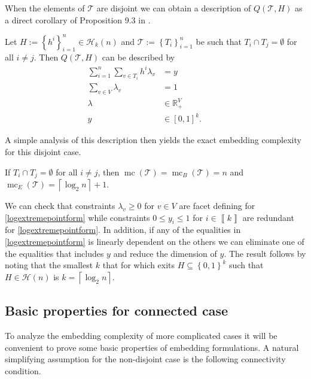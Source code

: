 \documentclass[mnsc]{informs3}
\newcommand{\set}[1]{\left\{#1\right\}}                     %
\newcommand{\bra}[1]{\left(#1\right)}
\newcommand{\sidx}[1]{\left\llbracket     #1 \right\rrbracket}
\newcommand{\Real}{\mathbb R}
\DeclareMathOperator{\mmc}{mc}
\begin{document}
When the elements of $\mathcal{T}$ are disjoint we can obtain a description of $Q\bra{\mathcal{T},H}$ as a direct corollary of Proposition 9.3 in \cite{Mixed-Integer-Linear-Programming-Formulation-Techniques}.
\begin{proposition}Let $H:=\set{h^i}_{i=1}^n\in \mathcal{H}_k(n)$ and $\mathcal{T}:=\set{T_i}_{i=1}^n$ be such that $T_i\cap T_j=\emptyset $ for all $i\neq j$. Then $Q\bra{\mathcal{T},H}$ can be described by 
	\begin{subequations}\label{logextremepointform}
		\begin{alignat}{3}
		\sum\nolimits_{i=1}^n\sum\nolimits_{v\in T_i}  h^i\lambda_{v}&=y&\\
			\sum\nolimits_{v\in V}  \lambda_{v}&=1\\
			\lambda&\in  \Real_+^V&\quad& \\
			y&\in[0,1]^{k}.
		\end{alignat}
	\end{subequations}
\end{proposition}
A simple analysis of this description then yields the exact embedding complexity for this disjoint case. 
\begin{proposition}
If $T_i\cap T_j=\emptyset $ for all $i\neq j$, then $\mmc\bra{\mathcal{T}}=\mmc_B\bra{\mathcal{T}}=n$ and $\mmc_E\bra{\mathcal{T}}= \left\lceil \log_2 n \right\rceil +1$.
\end{proposition}
We can check that constraints $\lambda_v \geq 0 $ for $v\in V$ are facet defining for \eqref{logextremepointform} while constraints $0\leq y_i\leq 1$ for $i\in \sidx{k}$ are redundant for \eqref{logextremepointform}. In addition, if any of the equalities in \eqref{logextremepointform}
is linearly dependent on the others we can eliminate one of the equalities that includes $y$ and reduce the dimension of $y$.  
The result follows by noting that the smallest $k$ that for which exits $H\subseteq \set{0,1}^k$ such that $H\in \mathcal{H}(n)$ is $k=\left\lceil \log_2 n \right\rceil$. 
\Halmos\endproof

\subsection{Basic properties for connected case}\label{connectedsection}

To analyze the embedding complexity of more complicated cases it will be convenient to prove some basic properties of embedding formulations. A natural simplifying assumption for the non-disjoint case is the following connectivity condition. 
\end{document}
